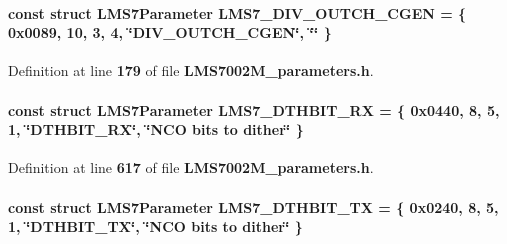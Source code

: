 \paragraph[{L\+M\+S7\+\_\+\+D\+I\+V\+\_\+\+O\+U\+T\+C\+H\+\_\+\+C\+G\+EN}]{\setlength{\rightskip}{0pt plus 5cm}const struct {\bf L\+M\+S7\+Parameter} L\+M\+S7\+\_\+\+D\+I\+V\+\_\+\+O\+U\+T\+C\+H\+\_\+\+C\+G\+EN = \{ 0x0089, 10, 3, 4, \char`\"{}\+D\+I\+V\+\_\+\+O\+U\+T\+C\+H\+\_\+\+C\+G\+E\+N\char`\"{}, \char`\"{}\char`\"{} \}\hspace{0.3cm}{\ttfamily [static]}}\label{LMS7002M__parameters_8h_a8886074d93afd8b4d4bcf986c858d473}


Definition at line {\bf 179} of file {\bf L\+M\+S7002\+M\+\_\+parameters.\+h}.

\paragraph[{L\+M\+S7\+\_\+\+D\+T\+H\+B\+I\+T\+\_\+\+RX}]{\setlength{\rightskip}{0pt plus 5cm}const struct {\bf L\+M\+S7\+Parameter} L\+M\+S7\+\_\+\+D\+T\+H\+B\+I\+T\+\_\+\+RX = \{ 0x0440, 8, 5, 1, \char`\"{}\+D\+T\+H\+B\+I\+T\+\_\+\+R\+X\char`\"{}, \char`\"{}\+N\+C\+O bits to dither\char`\"{} \}\hspace{0.3cm}{\ttfamily [static]}}\label{LMS7002M__parameters_8h_af36c48ce5c3f409c8baa7ce2fd331295}


Definition at line {\bf 617} of file {\bf L\+M\+S7002\+M\+\_\+parameters.\+h}.

\paragraph[{L\+M\+S7\+\_\+\+D\+T\+H\+B\+I\+T\+\_\+\+TX}]{\setlength{\rightskip}{0pt plus 5cm}const struct {\bf L\+M\+S7\+Parameter} L\+M\+S7\+\_\+\+D\+T\+H\+B\+I\+T\+\_\+\+TX = \{ 0x0240, 8, 5, 1, \char`\"{}\+D\+T\+H\+B\+I\+T\+\_\+\+T\+X\char`\"{}, \char`\"{}\+N\+C\+O bits to dither\char`\"{} \}\hspace{0.3cm}{\ttfamily [static]}}\label{LMS7002M__parameters_8h_a3c047f683763a5e2cd56984d9eac0ad4}


